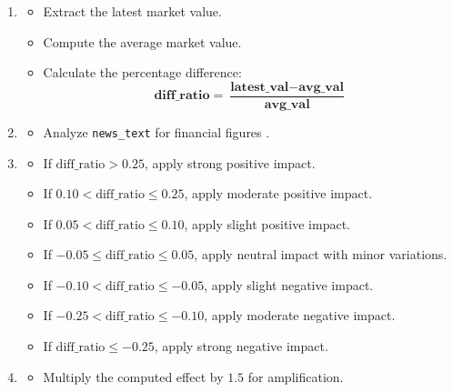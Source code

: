 \documentclass[3p,times,procedia]{elsarticle}
\begin{document}
 \cite{Banz1981}
\begin{enumerate}
    \item {}
    \begin{itemize}
        \item Extract the latest market value.
        \item Compute the average market value.
        \item Calculate the percentage difference:
       \begin{equation}
\bm{\textbf{diff\_ratio} = \frac{\textbf{latest\_val} - \textbf{avg\_val}}{\textbf{avg\_val}}}
\end{equation}

    \end{itemize}

    \item {}
    \begin{itemize}
        \item Analyze \texttt{news\_text} for financial figures \cite{Loughran2011}.
    \end{itemize}

\item {}
    \begin{itemize}
        \item If $\text{diff\_ratio} > 0.25$, apply strong positive impact.
        \item If $0.10 < \text{diff\_ratio} \leq 0.25$, apply moderate positive impact.
        \item If $0.05 < \text{diff\_ratio} \leq 0.10$, apply slight positive impact.
        \item If $-0.05 \leq \text{diff\_ratio} \leq 0.05$, apply neutral impact with minor variations.
        \item If $-0.10 < \text{diff\_ratio} \leq -0.05$, apply slight negative impact.
        \item If $-0.25 < \text{diff\_ratio} \leq -0.10$, apply moderate negative impact.
        \item If $\text{diff\_ratio} \leq -0.25$, apply strong negative impact.
    \end{itemize}

    \item {}
    \begin{itemize}
        \item Multiply the computed effect by $1.5$ for amplification.
    \end{itemize}
\end{enumerate}
\end{document}
